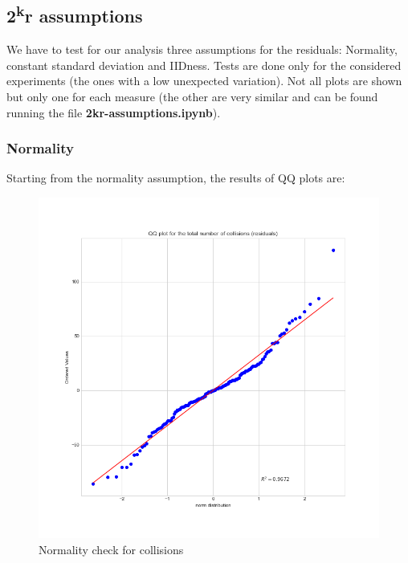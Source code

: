 \subsection{2\texorpdfstring{\textsuperscript{k}}{k}r assumptions}\label{subsec:ldass}

We have to test for our analysis three assumptions for the residuals: Normality,
constant standard deviation and IIDness. Tests are done only for the considered
experiments (the ones with a low unexpected variation). Not all plots are shown
but only one for each measure (the other are very similar and can be found
running the file \textbf{2kr-assumptions.ipynb}).

\subsubsection{Normality}

Starting from the normality assumption, the results of QQ plots  are:

\begin{figure}
	\centering
	\includegraphics[width=\textwidth]
	{img/lowdensity2kr/assumptions/collisions-norm-fit.png}
	\caption{Normality check for collisions}\label{fig:system}
\end{figure}

